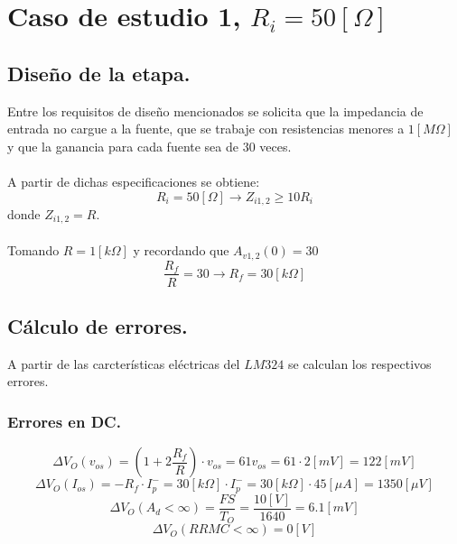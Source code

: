 \newpage

\section{Caso de estudio 1, $R_i=50[\Omega]$}

\subsection{Diseño de la etapa.}
\onehalfspacing
Entre los requisitos de diseño mencionados se solicita que la impedancia de entrada no cargue a la fuente, que se trabaje con resistencias menores a $1[M\Omega]$ y que la ganancia para cada fuente sea de $30$ veces.
\paragraph{}
A partir de dichas especificaciones se obtiene:
\begin{equation}
    \nonumber
    R_i=50[\Omega] \longrightarrow Z_{i1,2} \geq 10R_i
\end{equation}
donde $Z_{i1,2} = R$.
\paragraph{}
Tomando $R=1[k\Omega]$ y recordando que $A_{v1,2}(0)=30$
\begin{equation}
    \nonumber
    \frac{R_f}{R}=30 \longrightarrow R_f=30[k\Omega]
\end{equation}

\subsection{Cálculo de errores.}
\onehalfspacing
A partir de las carcterísticas eléctricas del $LM324$ se calculan los respectivos errores.

\subsubsection{Errores en DC.}
\onehalfspacing
\begin{equation}
    \nonumber
    \Delta V_{O}(v_{os}) = \left(1+2\frac{R_f}{R}\right) \cdot v_{os} = 61v_{os} = 61\cdot 2[mV]  = 122[mV]
\end{equation}
\begin{equation}
    \nonumber
    \Delta V_{O}(I_{os}) = -R_f\cdot I_p^{-} = 30[k\Omega]\cdot I_p^{-} = 30[k\Omega]\cdot 45[\mu A]  = 1350[\mu V]
\end{equation}
\begin{equation}
    \nonumber
    \Delta V_{O}(A_d<\infty) = \frac{FS}{T_O} = \frac{10[V]}{1640} = 6.1[mV]
\end{equation}
\begin{equation}
    \nonumber
    \Delta V_{O}(RRMC<\infty) = 0[V]
\end{equation}

